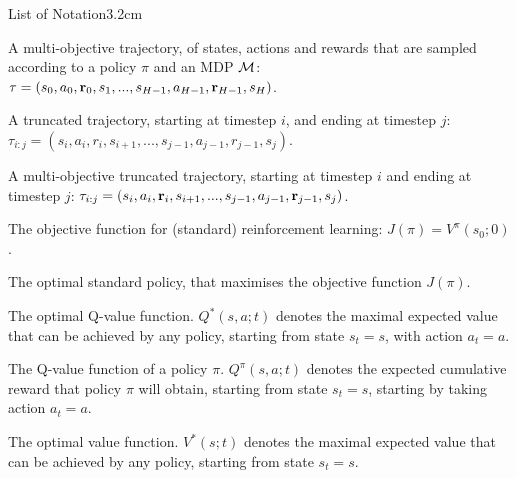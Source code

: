 \begin{mclistof}{List of Notation}{3.2cm}
    \item[$\bff{\tau}$]
        A multi-objective trajectory, of states, actions and rewards that are sampled according to a policy $\pi$ and an MDP $\mathcal{M}$: $\mathbf{\tau} = (s_0, a_0, \mathbf{r}_0, s_1, ..., s_{H-1}, a_{H-1}, \mathbf{r}_{H-1}, s_H)$.
    \item[$\tau_{i:j}$]
        A truncated trajectory, starting at timestep $i$, and ending at timestep $j$: $\tau_{i:j} = (s_i, a_i, r_i, s_{i+1}, ..., s_{j-1}, a_{j-1}, r_{j-1}, s_j)$. 
    \item[$\bff{\tau}_{i:j}$] 
        A multi-objective truncated trajectory, starting at timestep $i$ and ending at timestep $j$: $\mathbf{\tau}_{i:j} = (s_i, a_i, \mathbf{r}_i, s_{i+1}, ..., s_{j-1}, a_{j-1}, \mathbf{r}_{j-1}, s_j)$.
    \\
    \item[{\parbox[t]{\textwidth}{
            \Large\textbf{Reinforcement Learning (Section \ref{sec:2-3-rl})}\hfill\hfill
          }}]
    \item[$J(\pi)$] 
        The objective function for (standard) reinforcement learning: $J(\pi) = V^{\pi}(s_0;0)$.
    \item[$\pi^*$]
        The optimal standard policy, that maximises the objective function $J(\pi)$.
    \item[$Q^*$]
        The optimal Q-value function. $Q^*(s,a;t)$ denotes the maximal expected value that can be achieved by any policy, starting from state $s_t=s$, with action $a_t=a$.
    \item[$Q^{\pi}$]
        The Q-value function of a policy $\pi$. $Q^{\pi}(s,a;t)$ denotes the expected cumulative reward that policy $\pi$ will obtain, starting from state $s_t=s$, starting by taking action $a_t=a$.
    \item[$V^*$]
        The optimal value function. $V^*(s;t)$ denotes the maximal expected value that can be achieved by any policy, starting from state $s_t=s$.
    \item[$V^{\pi}$]

\end{mclistof}
